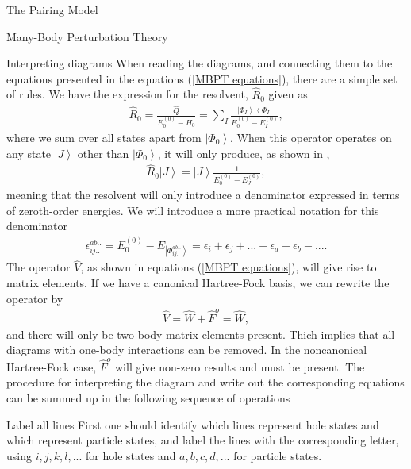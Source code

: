 \documentclass[twoside,english]{uiofysmaster}
\begin{document}
\begin{chapter}{The Pairing Model}
\begin{section}{Many-Body Perturbation Theory}
		\begin{subsection}{Interpreting diagrams}
			When reading the diagrams, and connecting them to the equations presented in the equations (\ref{MBPT equations}), there are a simple set of rules. We have the expression for the resolvent, $\hat R_0$ given as 
			\begin{align}
				\hat R_0 = \frac{\hat Q}{E_0^{(0)} - \hat H_0} = \sum_I \frac{\left| \Phi_I \right> \left< \Phi_I \right| }{E_0^{(0)} - E_I^{(0)}},
			\end{align}
			where we sum over all states apart from $\left| \Phi_0 \right>$. When this operator operates on any state $\left| J \right>$ other than $\left| \Phi_0 \right> $, it will only produce, as shown in \cite{ShavittAndBartlett}, 
			\begin{align}
				\hat R_0 \left| J \right> = \left| J \right> \frac{1}{E_0^{(0)} - E_J^{(0)}}, 
			\end{align}
			meaning that the resolvent will only introduce a denominator expressed in terms of zeroth-order energies. We will introduce a more practical notation for this denominator
			\begin{align}
				\epsilon_{ij..}^{ab..} = E_0^{(0)} - E_{\left| \Phi_{ij..}^{ab..} \right> } = \epsilon_i + \epsilon_j + ... - \epsilon_a - \epsilon_b - ... .
			\end{align}
			The operator $\hat V$, as shown in equations (\ref{MBPT equations}), will give rise to matrix elements. If we have a canonical Hartree-Fock basis, we can rewrite the operator by 
			\begin{align}
				\hat V = \hat W + \hat F^o = \hat W ,
			\end{align}
			and there will only be two-body matrix elements present. Thich implies that all diagrams with one-body interactions can be removed. In the noncanonical Hartree-Fock case, $\hat F^o$ will give non-zero results and must be present. The procedure for interpreting the diagram and write out the corresponding equations can be summed up in the following sequence of operations
		\end{subsection}

		\begin{subsection}{Label all lines}
			First one should identify which lines represent hole states and which represent particle states, and label the lines with the corresponding letter, using $i,j,k,l,...$ for hole states and $a,b,c,d,...$ for particle states. 
		\end{subsection}


\end{section}
\end{chapter}
\end{document}
